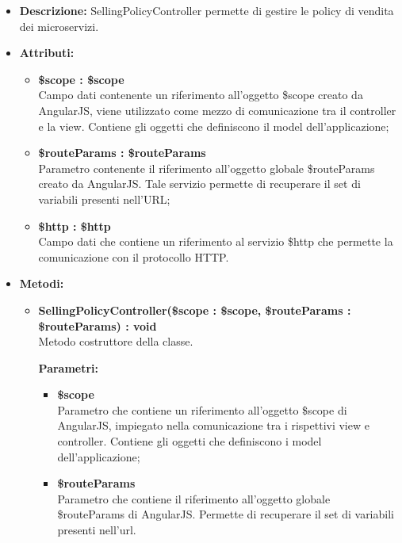 \begin{itemize}
	\item \textbf{Descrizione:} SellingPolicyController permette di gestire le policy di vendita dei
microservizi.
	\item \textbf{Attributi:}
		\begin{itemize}
		
			\item \textbf{\$scope : \$scope}\\
			Campo dati contenente un riferimento all'oggetto \$scope creato da AngularJS, viene utilizzato come mezzo di comunicazione tra il controller e la view. Contiene gli oggetti che definiscono il model dell'applicazione;
			
			\item \textbf{\$routeParams : \$routeParams}\\
			Parametro contenente il riferimento all'oggetto globale \$routeParams creato da AngularJS. Tale servizio permette di recuperare il set di variabili presenti nell'URL;

			\item \textbf{\$http : \$http }\\
			Campo dati che contiene un riferimento al servizio \$http che permette la comunicazione con il protocollo HTTP.
				
		\end{itemize}
	\item \textbf{Metodi:}
		\begin{itemize}
		
			\item \textbf{SellingPolicyController(\$scope : \$scope, \$routeParams : \$routeParams) : void}\\
			Metodo costruttore della classe.
			\begin{description}
    			\item[\textbf{Parametri:}]
			\end{description}
			\begin{itemize}
				\item \textbf{\$scope}\\
				Parametro che contiene un riferimento all'oggetto \$scope di AngularJS, impiegato nella comunicazione tra i rispettivi view e controller. Contiene gli oggetti che definiscono i model dell'applicazione;
				
				\item \textbf{\$routeParams}\\
				Parametro che contiene il riferimento all'oggetto globale \$routeParams di AngularJS. Permette di recuperare il set di variabili presenti nell'url.
			\end{itemize}
			

\end{itemize}
\end{itemize}
